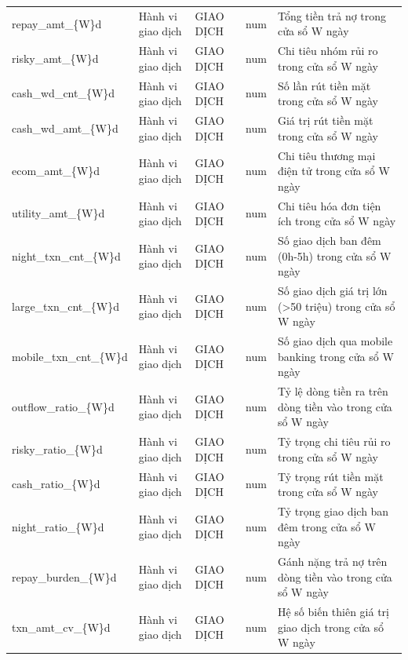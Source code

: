 \begin{longtable}{@{}L{3.761cm}L{2.121cm}L{2.314cm}L{1.061cm}L{4.918cm}@{}}
repay\_\allowbreak amt\_\allowbreak \{W\}d & Hành vi giao dịch & GIAO DỊCH & num & Tổng tiền trả nợ trong cửa sổ W ngày \\
risky\_\allowbreak amt\_\allowbreak \{W\}d & Hành vi giao dịch & GIAO DỊCH & num & Chi tiêu nhóm rủi ro trong cửa sổ W ngày \\
cash\_\allowbreak wd\_\allowbreak cnt\_\allowbreak \{W\}d & Hành vi giao dịch & GIAO DỊCH & num & Số lần rút tiền mặt trong cửa sổ W ngày \\
cash\_\allowbreak wd\_\allowbreak amt\_\allowbreak \{W\}d & Hành vi giao dịch & GIAO DỊCH & num & Giá trị rút tiền mặt trong cửa sổ W ngày \\
ecom\_\allowbreak amt\_\allowbreak \{W\}d & Hành vi giao dịch & GIAO DỊCH & num & Chi tiêu thương mại điện tử trong cửa sổ W ngày \\
utility\_\allowbreak amt\_\allowbreak \{W\}d & Hành vi giao dịch & GIAO DỊCH & num & Chi tiêu hóa đơn tiện ích trong cửa sổ W ngày \\
night\_\allowbreak txn\_\allowbreak cnt\_\allowbreak \{W\}d & Hành vi giao dịch & GIAO DỊCH & num & Số giao dịch ban đêm (0h-5h) trong cửa sổ W ngày \\
large\_\allowbreak txn\_\allowbreak cnt\_\allowbreak \{W\}d & Hành vi giao dịch & GIAO DỊCH & num & Số giao dịch giá trị lớn (>50 triệu) trong cửa sổ W ngày \\
mobile\_\allowbreak txn\_\allowbreak cnt\_\allowbreak \{W\}d & Hành vi giao dịch & GIAO DỊCH & num & Số giao dịch qua mobile banking trong cửa sổ W ngày \\
outflow\_\allowbreak ratio\_\allowbreak \{W\}d & Hành vi giao dịch & GIAO DỊCH & num & Tỷ lệ dòng tiền ra trên dòng tiền vào trong cửa sổ W ngày \\
risky\_\allowbreak ratio\_\allowbreak \{W\}d & Hành vi giao dịch & GIAO DỊCH & num & Tỷ trọng chi tiêu rủi ro trong cửa sổ W ngày \\
cash\_\allowbreak ratio\_\allowbreak \{W\}d & Hành vi giao dịch & GIAO DỊCH & num & Tỷ trọng rút tiền mặt trong cửa sổ W ngày \\
night\_\allowbreak ratio\_\allowbreak \{W\}d & Hành vi giao dịch & GIAO DỊCH & num & Tỷ trọng giao dịch ban đêm trong cửa sổ W ngày \\
repay\_\allowbreak burden\_\allowbreak \{W\}d & Hành vi giao dịch & GIAO DỊCH & num & Gánh nặng trả nợ trên dòng tiền vào trong cửa sổ W ngày \\
txn\_\allowbreak amt\_\allowbreak cv\_\allowbreak \{W\}d & Hành vi giao dịch & GIAO DỊCH & num & Hệ số biến thiên giá trị giao dịch trong cửa sổ W ngày \\

\end{longtable}
